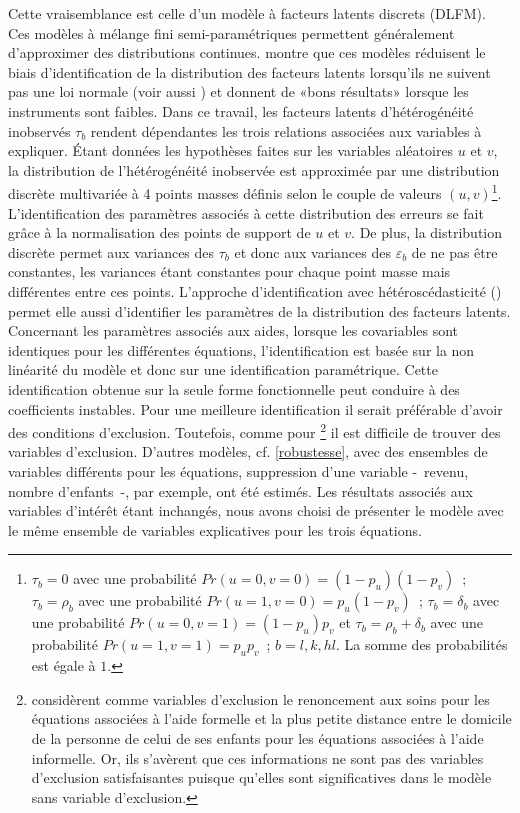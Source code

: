 \begin{Article}
\begin{refsection}[Bonnal]
Cette vraisemblance est celle d’un modèle à facteurs latents discrets (DLFM). Ces modèles à mélange fini semi-paramétriques permettent généralement d'approximer des distributions continues. \textcite{mroz1999} montre que ces modèles réduisent le biais d'identification de la distribution des facteurs latents lorsqu'ils ne suivent pas une loi normale (voir aussi \textcite{heckman2007}) et donnent de «bons résultats» lorsque les instruments sont faibles. Dans ce travail, les facteurs latents d'hétérogénéité inobservés $\tau_b$ rendent dépendantes les trois relations associées aux variables à expliquer. Étant données les hypothèses faites sur les variables aléatoires $u$ et $v$, la distribution de l'hétérogénéité inobservée est approximée par une distribution discrète multivariée à 4 points masses définis selon le couple de valeurs $(u,v)$\footnote{$\tau_b=0$ avec une probabilité $Pr(u=0,v=0)=(1-p_u)(1-p_v)$~; $\tau_b=\rho_b$ avec une probabilité $Pr(u=1,v=0)=p_u(1-p_v)$~; $\tau_b=\delta_b$ avec une probabilité $Pr(u=0,v=1)=(1-p_u)p_v$ et $\tau_b=\rho_b+\delta_b$ avec une probabilité $Pr(u=1,v=1)=p_u p_v$~; $b=l,k,hl$. La somme des probabilités est égale à $1$.}. L’identification des paramètres associés à cette distribution des erreurs se fait grâce à la normalisation des points de support de $u$ et $v$. De plus, la distribution discrète permet aux variances des $\tau_b$ et donc aux variances des $\varepsilon_b$ de ne pas être constantes, les variances étant constantes pour chaque point masse mais différentes entre ces points. L’approche d'identification avec hétéroscédasticité (\textcite{lewbel2012}) permet elle aussi d'identifier les paramètres de la distribution des facteurs latents. Concernant les paramètres associés aux aides, lorsque les covariables sont identiques pour les différentes équations, l'identification est basée sur la non linéarité du modèle et donc sur une identification paramétrique. Cette identification obtenue sur la seule forme fonctionnelle peut conduire à des coefficients instables. Pour une meilleure identification il serait préférable d’avoir des conditions d'exclusion. Toutefois, comme pour \textcite{BALIA2014}\footnote{\textcite{BALIA2014} considèrent comme variables d'exclusion le renoncement aux soins pour les équations associées à l'aide formelle et la plus petite distance entre le domicile de la personne de celui de ses enfants pour les équations associées à l'aide informelle. Or, ils s'avèrent que ces informations ne sont pas des variables d'exclusion satisfaisantes puisque qu'elles sont significatives dans le modèle sans variable d'exclusion.} il est difficile de trouver des variables d'exclusion. D'autres modèles, cf. \autoref{robustesse}, avec des ensembles de variables différents pour les équations, suppression d'une variable -~revenu, nombre d'enfants~-, par exemple, ont été estimés. Les résultats associés aux variables d'intérêt étant inchangés, nous avons choisi de présenter le modèle avec le même ensemble de variables explicatives pour les trois équations.


\end{refsection}
\end{Article}
